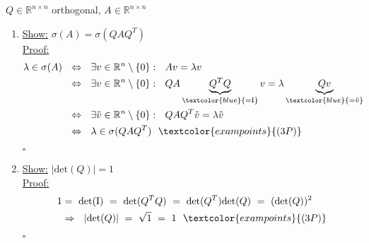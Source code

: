 {\color{solution}
$Q\in\mathbb{R}^{n\times n}$ orthogonal, $A\in\mathbb{R}^{n\times n}$
\begin{enumerate}
\item 
\underline{Show:} $\sigma(A)=\sigma(QAQ^T)$\\
\underline{Proof:}
\begin{align*} \lambda\in\sigma(A)~~&\Leftrightarrow~~\exists v\in\mathbb{R}^n\setminus\{0\}:~~Av=\lambda v\\
&\Leftrightarrow~~\exists v\in\mathbb{R}^n\setminus\{0\}:~~QA\underbrace{Q^TQ}_{\textcolor{blue}{=\text{I}}}v=\lambda\underbrace{Qv}_{\textcolor{blue}{=\tilde{v}}}\\
&\Leftrightarrow~~\exists \tilde{v}\in\mathbb{R}^n\setminus\{0\}:~~QAQ^T\tilde{v}=\lambda \tilde{v}\\
&\Leftrightarrow~~\lambda\in\sigma(QAQ^T)~~\textcolor{exampoints}{(3P)}
\end{align*}
\begin{flushright}$\square$\end{flushright}
\item 
\underline{Show:} $|\text{det}(Q)|=1$\\
\underline{Proof:}
\begin{align*}
1 &= ~\text{det}(\text{I})~=~\text{det}(Q^TQ)~=~\text{det}(Q^T)\text{det}(Q)~=~(\text{det}(Q))^2\\
&\Rightarrow~~|\text{det}(Q)|~=~\sqrt{1}~=~1~~\textcolor{exampoints}{(3P)}
\end{align*}
\begin{flushright}$\square$\end{flushright}
\end{enumerate}
}